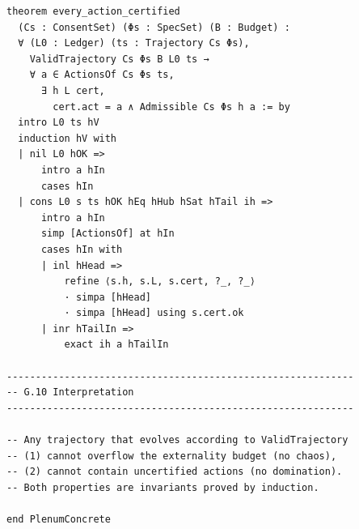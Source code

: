 \documentclass[11pt,oneside]{article}
\begin{document}
\begin{verbatim}
theorem every_action_certified
  (Cs : ConsentSet) (Φs : SpecSet) (B : Budget) :
  ∀ (L0 : Ledger) (ts : Trajectory Cs Φs),
    ValidTrajectory Cs Φs B L0 ts →
    ∀ a ∈ ActionsOf Cs Φs ts,
      ∃ h L cert,
        cert.act = a ∧ Admissible Cs Φs h a := by
  intro L0 ts hV
  induction hV with
  | nil L0 hOK =>
      intro a hIn
      cases hIn
  | cons L0 s ts hOK hEq hHub hSat hTail ih =>
      intro a hIn
      simp [ActionsOf] at hIn
      cases hIn with
      | inl hHead =>
          refine ⟨s.h, s.L, s.cert, ?_, ?_⟩
          · simpa [hHead]
          · simpa [hHead] using s.cert.ok
      | inr hTailIn =>
          exact ih a hTailIn

------------------------------------------------------------
-- G.10 Interpretation
------------------------------------------------------------

-- Any trajectory that evolves according to ValidTrajectory
-- (1) cannot overflow the externality budget (no chaos),
-- (2) cannot contain uncertified actions (no domination).
-- Both properties are invariants proved by induction.

end PlenumConcrete
\end{verbatim}
\end{document}
